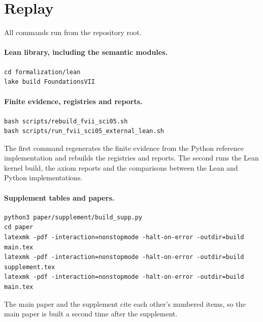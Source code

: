 \section{Replay}
\label{supp:replay}

All commands run from the repository root.

\paragraph{Lean library, including the semantic modules.}
\begin{verbatim}
cd formalization/lean
lake build FoundationsVII
\end{verbatim}

\paragraph{Finite evidence, registries and reports.}
\begin{verbatim}
bash scripts/rebuild_fvii_sci05.sh
bash scripts/run_fvii_sci05_external_lean.sh
\end{verbatim}
The first command regenerates the finite evidence from the Python reference
implementation and rebuilds the registries and reports. The second runs the Lean kernel
build, the axiom reports and the comparisons between the Lean and Python implementations.

\paragraph{Supplement tables and papers.}
\begin{verbatim}
python3 paper/supplement/build_supp.py
cd paper
latexmk -pdf -interaction=nonstopmode -halt-on-error -outdir=build main.tex
latexmk -pdf -interaction=nonstopmode -halt-on-error -outdir=build supplement.tex
latexmk -pdf -interaction=nonstopmode -halt-on-error -outdir=build main.tex
\end{verbatim}
The main paper and the supplement cite each other's numbered items, so the main paper is
built a second time after the supplement.
